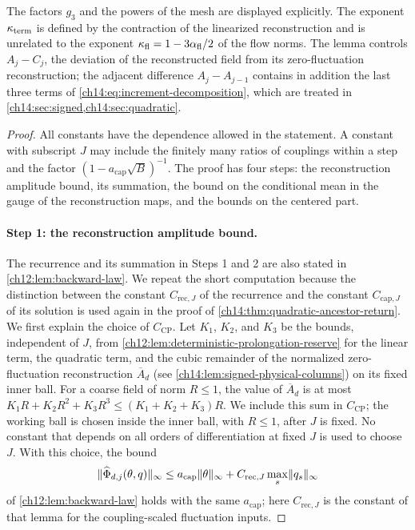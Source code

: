 The factors $g_3$ and the powers of the mesh are displayed explicitly. The exponent $\kappa_{\mathrm{term}}$ is defined by the contraction of the linearized reconstruction and is unrelated to the exponent $\kappa_{\mathrm{fl}}=1-3\alpha_{\mathrm{fl}}/2$ of the flow norms. The lemma controls $A_j-C_j$, the deviation of the reconstructed field from its zero-fluctuation reconstruction; the adjacent difference $A_j-A_{j-1}$ contains in addition the last three terms of \eqref{ch14:eq:increment-decomposition}, which are treated in \cref{ch14:sec:signed,ch14:sec:quadratic}.

\begin{proof}
All constants have the dependence allowed in the statement. A constant with subscript $J$ may include the finitely many ratios of couplings within a step and the factor $(1-a_{\mathrm{cap}}\sqrt B)^{-1}$. The proof has four steps: the reconstruction amplitude bound, its summation, the bound on the conditional mean in the gauge of the reconstruction maps, and the bounds on the centered part.

\paragraph{Step 1: the reconstruction amplitude bound.}
The recurrence and its summation in Steps 1 and 2 are also stated in \cref{ch12:lem:backward-law}. We repeat the short computation because the distinction between the constant $C_{\mathrm{rec},J}$ of the recurrence and the constant $C_{\mathrm{cap},J}$ of its solution is used again in the proof of \cref{ch14:thm:quadratic-ancestor-return}. We first explain the choice of $C_{\mathrm{CP}}$. Let $K_1$, $K_2$, and $K_3$ be the bounds, independent of $J$, from \cref{ch12:lem:deterministic-prolongation-reserve} for the linear term, the quadratic term, and the cubic remainder of the normalized zero-fluctuation reconstruction $\overline A_d$ (see \cref{ch14:lem:signed-physical-columns}) on its fixed inner ball. For a coarse field of norm $R\le1$, the value of $\overline A_d$ is at most $K_1R+K_2R^2+K_3R^3\le(K_1+K_2+K_3)R$. We include this sum in $C_{\mathrm{CP}}$; the working ball is chosen inside the inner ball, with $R\le1$, after $J$ is fixed. No constant that depends on all orders of differentiation at fixed $J$ is used to choose $J$. With this choice, the bound
\[
 \lVert \widehat\Phi_{d,j}(\theta,q)\rVert_\infty\le a_{\mathrm{cap}}\lVert \theta\rVert_\infty+C_{\mathrm{rec},J}\max_s\lVert q_s\rVert_\infty
\]
of \cref{ch12:lem:backward-law} holds with the same $a_{\mathrm{cap}}$; here $C_{\mathrm{rec},J}$ is the constant of that lemma for the coupling-scaled fluctuation inputs. 


\end{proof}
